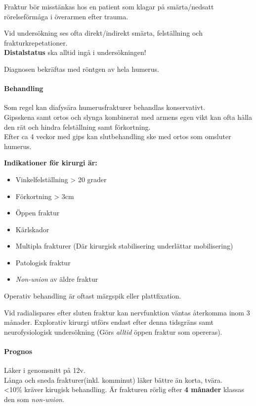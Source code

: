 \documentclass[
  letterpaper,
  DIV=11,
  numbers=noendperiod]{scrreport}
\let\oldparagraph\paragraph
\renewcommand{\paragraph}[1]{\oldparagraph{#1}\mbox{}}
\providecommand{\tightlist}{%
  \setlength{\itemsep}{0pt}\setlength{\parskip}{0pt}}\usepackage{longtable,booktabs,array}
\begin{document}
Fraktur bör misstänkas hos en patient som klagar på smärta/nedsatt
rörelseförmåga i överarmen efter trauma.

Vid undersökning ses ofta direkt/indirekt smärta, felställning och
frakturkrepetationer.\\
\textbf{Distalstatus} ska alltid ingå i undersökningen!

Diagnosen bekräftas med röntgen av hela humerus.

\hypertarget{behandling}{%
\paragraph{Behandling}\label{behandling}}

Som regel kan diafysära humerusfrakturer behandlas konservativt.\\
Gipsskena samt ortos och slynga kombinerat med armens egen vikt kan ofta
hålla den rät och hindra felställning samt förkortning.\\
Efter ca 4 veckor med gips kan slutbehandling ske med ortos som omsluter
humerus.

\textbf{Indikationer för kirurgi är:}

\begin{itemize}
\tightlist
\item
  Vinkelfelställning \textgreater{} 20 grader
\item
  Förkortning \textgreater{} 3cm
\item
  Öppen fraktur
\item
  Kärlskador
\item
  Multipla frakturer (Där kirurgisk stabilisering underlättar
  mobilisering)
\item
  Patologisk fraktur
\item
  \emph{Non-union} av äldre fraktur
\end{itemize}

Operativ behandling är oftast märgspik eller plattfixation.

Vid radialispares efter sluten fraktur kan nervfunktion väntas återkomma
inom 3 månader. Explorativ kirurgi utförs endast efter denna tidsgräns
samt neurofysiologisk undersökning (Görs \emph{alltid} öppen fraktur som
opereras).

\hypertarget{prognos}{%
\paragraph{Prognos}\label{prognos}}

Läker i genomsnitt på 12v.\\
Långa och sneda frakturer(inkl. komminut) läker bättre än korta,
tvära.\\
\textless10\% kräver kirugisk behandling. Är frakturen rörlig efter
\textbf{4 månader} klassas den som \emph{non-union}.
\end{document}
